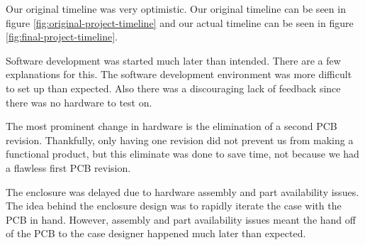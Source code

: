 Our original timeline was very optimistic.  Our original timeline can be seen
in figure \ref{fig:original-project-timeline} and our actual timeline can be
seen in figure \ref{fig:final-project-timeline}.

Software development was started much later than intended. There are a few
explanations for this.  The software development environment was more
difficult to set up than expected.  Also there was a discouraging lack of
feedback since there was no hardware to test on.

The most prominent change in hardware is the elimination of a second PCB
revision. Thankfully, only having one revision did not prevent us from making a
functional product, but this eliminate was done to save time, not because we
had a flawless first PCB revision.

The enclosure was delayed due to hardware assembly and part availability
issues.  The idea behind the enclosure design was to rapidly iterate the case
with the PCB in hand.  However, assembly and part availability issues meant the
hand off of the PCB to the case designer happened much later than expected.



\newcommand\mygantttitle {
    \gantttitlecalendar{year} \\
    \gantttitlecalendar{month} \\
    \gantttitlecalendar{week}
}

\newcommand\proposalColor{blue!70}
\newcommand\progressColor{red!70}
\newcommand\finalColor{green!70}

\newcommand\proposalBar[3]
{\ganttbar[bar/.append style={fill=\proposalColor}]{#1}{#2}{#3}}
\newcommand\progressBar[3]
{\ganttbar[bar/.append style={fill=\progressColor}]{#1}{#2}{#3}}
\newcommand\finalBar[3]
{\ganttbar[bar/.append style={fill=\finalColor}]{#1}{#2}{#3}}


